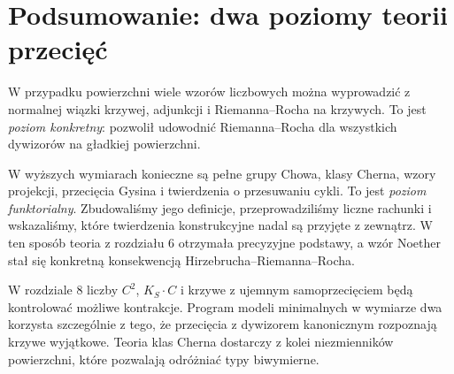 \section{Podsumowanie: dwa poziomy teorii przecięć}
\label{sec:ga7-summary}

W przypadku powierzchni wiele wzorów liczbowych można
wyprowadzić z normalnej wiązki krzywej, adjunkcji
i Riemanna--Rocha na krzywych. To jest \emph{poziom
konkretny}: pozwolił udowodnić Riemanna--Rocha dla
wszystkich dywizorów na gładkiej powierzchni.

W wyższych wymiarach konieczne są pełne grupy Chowa,
klasy Cherna, wzory projekcji, przecięcia Gysina
i twierdzenia o przesuwaniu cykli. To jest
\emph{poziom funktorialny}. Zbudowaliśmy jego definicje,
przeprowadziliśmy liczne rachunki i wskazaliśmy,
które twierdzenia konstrukcyjne nadal są przyjęte
z zewnątrz. W ten sposób teoria z rozdziału 6
otrzymała precyzyjne podstawy, a wzór Noether
stał się konkretną konsekwencją
Hirzebrucha--Riemanna--Rocha.

\begin{uwaga}
W rozdziale 8 liczby $C^2$, $K_S\cdot C$ i krzywe
z ujemnym samoprzecięciem będą kontrolować możliwe
kontrakcje. Program modeli minimalnych w wymiarze dwa
korzysta szczególnie z tego, że przecięcia z dywizorem
kanonicznym rozpoznają krzywe wyjątkowe. Teoria
klas Cherna dostarczy z kolei niezmienników powierzchni,
które pozwalają odróżniać typy biwymierne.
\end{uwaga}


